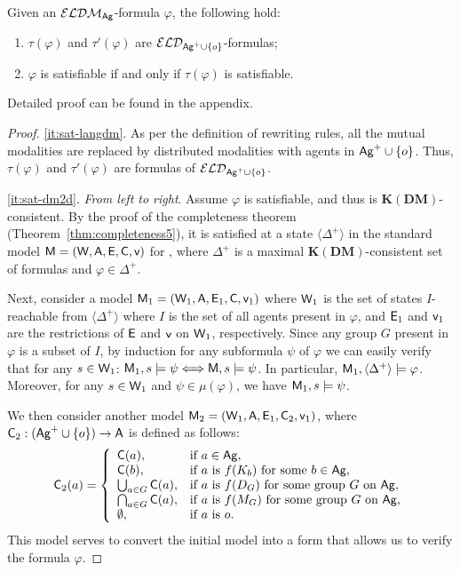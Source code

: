 \documentclass{article}
\newcommand{\ag}{\text{\normalfont\textsf{Ag}}\xspace}
\newcommand{\CA}{\textnormal{\sf A}\xspace}
\newcommand{\CC}{\textnormal{\sf C}\xspace}
\newcommand{\CE}{\textnormal{\sf E}\xspace}
\newcommand{\CM}{\textnormal{\sf M}\xspace}
\newcommand{\CV}{\textnormal{\sf v}\xspace}
\newcommand{\CW}{\textnormal{\sf W}\xspace}
\renewcommand{\phi}{\varphi}
\newcommand{\langd}{\ensuremath{\mathcal{ELD}}\xspace}
\newcommand{\langdm}{\ensuremath{\mathcal{ELDM}}\xspace}
\newcommand{\ldm}{\text{\normalfont ELDM}\xspace}
\newcommand{\KDM}{\ensuremath{\mathbf{K(DM)}}\xspace}
\begin{document}
\begin{propositionrep}\label{lem:sat-dm2d}
Given an $\langdm_\ag$-formula $\phi$, the following hold:
\begin{enumerate}
\item \label{it:sat-langdm} $\tau(\phi)$ and $\tau'(\phi)$ are $\langd_{\ag^+\cup\{o\}}$-formulas;
\item \label{it:sat-dm2d} $\phi$ is satisfiable if and only if $\tau(\phi)$ is satisfiable.
\end{enumerate}
\end{propositionrep}
\begin{inlineproof}
Detailed proof can be found in the appendix.
\end{inlineproof}
\begin{proof}
\ref{it:sat-langdm}. As per the definition of rewriting rules, all the mutual modalities are replaced by distributed modalities with agents in $\ag^+\cup\{o\}$. Thus, $\tau(\phi)$ and $\tau'(\phi)$ are formulas of $\langd_{\ag^+\cup\{o\}}$.

\ref{it:sat-dm2d}. 
\emph{From left to right}. 
Assume $\phi$ is satisfiable, and thus is \KDM-consistent. By the proof of the completeness theorem (Theorem~\ref{thm:completeness5}), it is satisfied at a state $\langle\Delta^+\rangle$ in the standard model $\CM=(\CW,\CA,\CE,\CC,\CV)$ for \ldm, where $\Delta^+$ is a maximal $\KDM$-consistent set of formulas and $\phi\in\Delta^+$.

Next, consider a model $\CM_1=(\CW_1,\CA,\CE_1,\CC,\CV_1)$ where $\CW_1$ is the set of states $I$-reachable from $\langle\Delta^+\rangle$ where $I$ is the set of all agents present in $\phi$, and $\CE_1$ and $\CV_1$ are the restrictions of $\CE$ and $\CV$ on $\CW_1$, respectively. Since any group $G$ present in $\phi$ is a subset of $I$, by induction for any subformula $\psi$ of $\phi$ we can easily verify that for any $s\in\CW_1$: $\CM_1,s\models\psi \Longleftrightarrow \CM,s\models\psi$. In particular, $\CM_1,\langle\Delta^+\rangle\models\phi$. Moreover, for any $s\in\CW_1$ and $\psi\in\mu(\phi)$, we have $\CM_1,s\models\psi$.

We then consider another model $\CM_2=(\CW_1,\CA,\CE_1,\CC_2,\CV_1)$, where $\CC_2:(\ag^+\cup\{o\}) \to \CA$ is defined as follows:
$$\CC_2(a)  = \left\{\begin{array}{ll}
	\CC(a), & \text{if $a\in\ag$},\\
	\CC(b), & \text{if $a$ is $f(K_b)$ for some $b\in\ag$},\\
	\bigcup_{a\in G} \CC(a), & \text{if $a$ is $f(D_G)$ for some group $G$ on $\ag$},\\
	\bigcap_{a\in G} \CC(a), & \text{if $a$ is $f(M_G)$ for some group $G$ on $\ag$},\\
	\emptyset, & \text{if $a$ is $o$}.
\end{array}\right.$$
This model serves to convert the initial model into a form that allows us to verify the formula $\phi$.


\end{proof}
\end{document}
